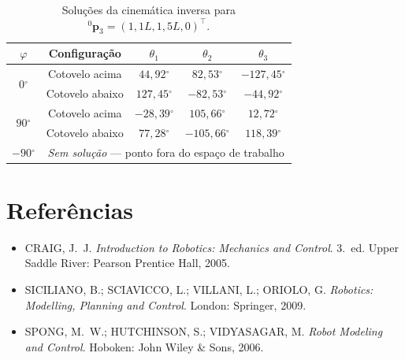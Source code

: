 \documentclass[12pt,a4paper]{article}
\newcommand{\degr}{\ensuremath{^{\circ}}}
\begin{document}
\begin{table}[h!]
  \centering
  \caption{Solu\c{c}\~oes da cinem\'atica inversa para ${}^0\mathbf{p}_3=(1{,}1L,1{,}5L,0)^\top$.}
  \label{tab:ik_results}
  \renewcommand{\arraystretch}{1.4}
  \begin{tabular}{ccccc}
    \toprule
    $\varphi$ & Configura\c{c}\~ao & $\theta_1$ & $\theta_2$ & $\theta_3$ \\
    \midrule
    \multirow{2}{*}{$0\degr$}
      & Cotovelo acima  & $44{,}92\degr$  & $82{,}53\degr$   & $-127{,}45\degr$ \\
      & Cotovelo abaixo & $127{,}45\degr$ & $-82{,}53\degr$  & $-44{,}92\degr$ \\
    \midrule
    \multirow{2}{*}{$90\degr$}
      & Cotovelo acima  & $-28{,}39\degr$ & $105{,}66\degr$  & $12{,}72\degr$ \\
      & Cotovelo abaixo & $77{,}28\degr$  & $-105{,}66\degr$ & $118{,}39\degr$ \\
    \midrule
    $-90\degr$ & \multicolumn{4}{c}{\textit{Sem solu\c{c}\~ao} --- ponto fora do espa\c{c}o de trabalho} \\
    \bottomrule
  \end{tabular}
\end{table}

\newpage
\section*{Refer\^encias}

\begin{itemize}[leftmargin=2cm, itemsep=4pt]
  \item CRAIG, J.~J. \textit{Introduction to Robotics: Mechanics and Control}.
        3.~ed. Upper Saddle River: Pearson Prentice Hall, 2005.
  \item SICILIANO, B.; SCIAVICCO, L.; VILLANI, L.; ORIOLO, G.
        \textit{Robotics: Modelling, Planning and Control}.
        London: Springer, 2009.
  \item SPONG, M.~W.; HUTCHINSON, S.; VIDYASAGAR, M.
        \textit{Robot Modeling and Control}.
        Hoboken: John Wiley \& Sons, 2006.
\end{itemize}
\end{document}
